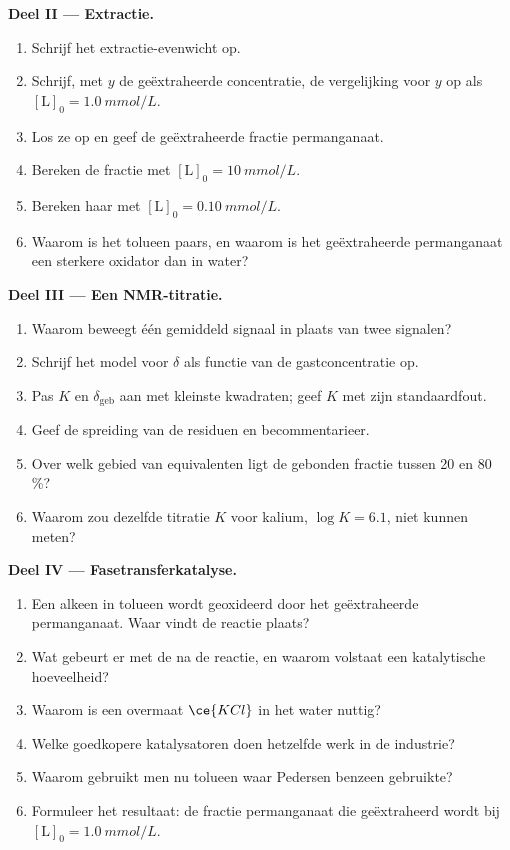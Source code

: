 \begin{problem}
\medskip\noindent\textbf{Deel II --- Extractie.}
\begin{enumerate}[resume]
  \item Schrijf het extractie-evenwicht op.
  \item Schrijf, met $y$ de geëxtraheerde concentratie, de vergelijking voor $y$ op als
        $[\mathrm L]_0 = \qty{1.0}{mmol/L}$.
  \item Los ze op en geef de geëxtraheerde fractie permanganaat.
  \item Bereken de fractie met $[\mathrm L]_0 = \qty{10}{mmol/L}$.
  \item Bereken haar met $[\mathrm L]_0 = \qty{0.10}{mmol/L}$.
  \item Waarom is het tolueen paars, en waarom is het geëxtraheerde
        permanganaat een sterkere oxidator dan in water?
\end{enumerate}

\medskip\noindent\textbf{Deel III --- Een NMR-titratie.}
\begin{enumerate}[resume]
  \item Waarom beweegt één gemiddeld signaal in plaats van twee signalen?
  \item Schrijf het model voor $\delta$ als functie van de gastconcentratie op.
  \item Pas $K$ en $\delta_{\mathrm{geb}}$ aan met kleinste kwadraten; geef $K$ met zijn standaardfout.
  \item Geef de spreiding van de residuen en becommentarieer.
  \item Over welk gebied van equivalenten ligt de gebonden fractie tussen
        20 en 80\,\%?
  \item Waarom zou dezelfde titratie $K$ voor kalium, $\log K = 6.1$, niet kunnen meten?
\end{enumerate}

\medskip\noindent\textbf{Deel IV --- Fasetransferkatalyse.}
\begin{enumerate}[resume]
  \item Een alkeen in tolueen wordt geoxideerd door het geëxtraheerde
        permanganaat. Waar vindt de reactie plaats?
  \item Wat gebeurt er met de  na de reactie, en waarom volstaat
        een katalytische hoeveelheid?
  \item Waarom is een overmaat $\ce{KCl}$ in het water nuttig?
  \item Welke goedkopere katalysatoren doen hetzelfde werk in de
        industrie?
  \item Waarom gebruikt men nu tolueen waar Pedersen benzeen gebruikte?
  \item Formuleer het resultaat: de fractie permanganaat die geëxtraheerd
        wordt bij
        $[\mathrm L]_0 = \qty{1.0}{mmol/L}$.
\end{enumerate}
\end{problem}
